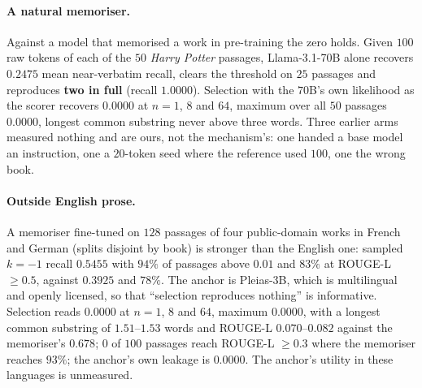 \paragraph{A natural memoriser.}
Against a model that memorised a work in pre-training the zero holds. Given $100$ raw tokens of each of
the $50$ \emph{Harry Potter} passages, Llama-3.1-70B alone recovers $0.2475$ mean near-verbatim recall,
clears the threshold on $25$ passages and reproduces \textbf{two in full} (recall $1.0000$). Selection
with the $70$B's own likelihood as the scorer recovers $0.0000$ at $n=1$, $8$ and $64$, maximum over all
$50$ passages $0.0000$, longest common substring never above three words. Three earlier arms measured
nothing and are ours, not the mechanism's: one handed a base model an instruction, one a $20$-token seed
where the reference used $100$, one the wrong book.

\paragraph{Outside English prose.}\label{app:multilingual}
A memoriser fine-tuned on $128$ passages of four public-domain works in French and German (splits
disjoint by book) is stronger than the English one: sampled $k=-1$ recall $0.5455$ with $94\%$ of passages
above $0.01$ and $83\%$ at ROUGE-L $\ge 0.5$, against $0.3925$ and $78\%$. The anchor is Pleias-3B, which
is multilingual and openly licensed, so that ``selection reproduces nothing'' is informative. Selection reads $0.0000$ at $n=1$, $8$ and $64$, maximum $0.0000$, with a longest common substring of $1.51$--$1.53$ words and ROUGE-L $0.070$--$0.082$ against the memoriser's $0.678$; $0$ of $100$ passages reach ROUGE-L $\ge 0.3$
where the memoriser reaches $93\%$; the anchor's own leakage is $0.0000$. The anchor's utility in these
languages is unmeasured.

